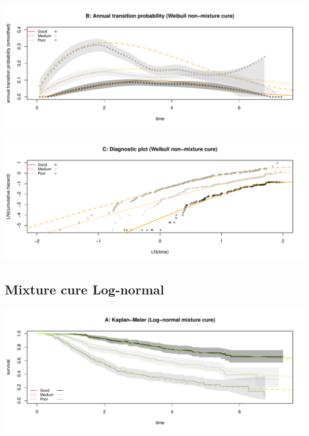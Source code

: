 \documentclass[]{article}
\begin{document}
\begin{flushleft}\includegraphics[height=0.25\textheight]{Images/cure_weib_nmix-2} \end{flushleft}

\begin{flushleft}\includegraphics[height=0.25\textheight]{Images/cure_weib_nmix-3} \end{flushleft}

\newpage

\subsection{Mixture cure Log-normal}\label{mixture-cure-log-normal}

\begin{flushleft}\includegraphics[height=0.25\textheight]{Images/cure_lnorm_mix-1} \end{flushleft}
\end{document}
